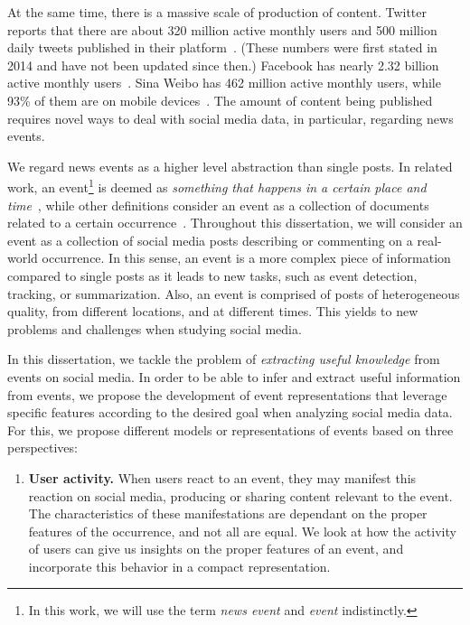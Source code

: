 \begin{intro}

At the same time, there is a massive scale of production of content. 
%
Twitter reports that there are about 320 million active monthly users and 500
million daily tweets published in their platform~\cite{twitter2014}. 
%
(These numbers were first stated in 2014 and have not been updated since then.)
%
Facebook has nearly 2.32 billion active monthly users~\cite{fbnewsroom}. 
%
Sina Weibo has 462 million active monthly users, while 93\% of them are on
mobile devices~\cite{chinawatch}.
%
The amount of content being published requires novel ways to deal with social
media data, in particular, regarding news events.



We regard news events as a higher level abstraction than single
posts.
%
In related work, an event\footnote{In this work, we will use the term {\em news
event} and {\em event} indistinctly.} is deemed as {\em something that happens
in a certain place and time}~\cite{yang1999learning}, while other definitions
consider an event as a collection of documents related to a certain
occurrence~\cite{Becker:2010:LSM:1718487.1718524}.
%
Throughout this dissertation, we will consider an event as a collection of
social media posts describing or commenting on a real-world occurrence.
%
In this sense, an event is a more complex piece of information compared to
single posts as it leads to new tasks, such as event detection, tracking, or
summarization.
%
Also, an event is comprised of posts of heterogeneous quality, from different
locations, and at different times.
%
This yields to new problems and challenges when studying social media.



In this dissertation, we tackle the problem of {\em extracting useful knowledge}
from events on social media. 
%
In order to be able to infer and extract useful information from events, we
propose the development of event representations that leverage specific features
according to the desired goal when analyzing social media data.
%
For this, we propose different models or representations of events based on
three perspectives:
%

\begin{enumerate}
    \item {\bf User activity.} 
    When users react to an event, they may manifest this reaction on social
    media, producing or sharing content relevant to the event. 
    The characteristics of these manifestations are dependant on the proper
    features of the occurrence, and not all are equal. 
    We look at how the activity of users can give us insights on the proper
    features of an event, and incorporate this behavior in a compact
    representation.


\end{enumerate}
\end{intro}
